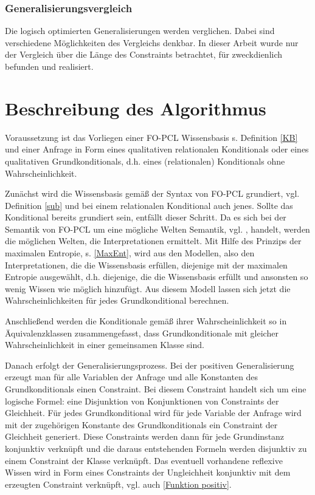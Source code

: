 \documentclass[a4paper, 11pt]{book}
\begin{document}
{\subsubsection{Generalisierungsvergleich}
Die logisch optimierten Generalisierungen werden verglichen. Dabei sind verschiedene Möglichkeiten des Vergleichs denkbar. In dieser Arbeit wurde nur der Vergleich über die Länge des Constraints betrachtet, für zweckdienlich befunden und realisiert.

\section{Beschreibung des Algorithmus}
Voraussetzung ist das Vorliegen einer FO-PCL Wissensbasis  s. Definition \ref{KB} und einer Anfrage in Form eines qualitativen relationalen Konditionals oder eines qualitativen Grundkonditionals, d.h. eines (relationalen) Konditionals ohne Wahrscheinlichkeit.

Zunächst wird die Wissensbasis gemäß der Syntax von FO-PCL grundiert, vgl. Definition \ref{sub}  und bei einem relationalen Konditional auch jenes. Sollte das Konditional bereits grundiert sein, entfällt dieser Schritt. Da es sich bei der Semantik von FO-PCL um eine mögliche Welten Semantik, vgl. \cite{GT07}, handelt, werden die möglichen Welten, die Interpretationen ermittelt. Mit Hilfe des Prinzips der maximalen Entropie, s. \ref{MaxEnt},  wird aus den Modellen, also den Interpretationen, die die Wissensbasis erfüllen, diejenige mit der maximalen Entropie ausgewählt, d.h. diejenige, die die Wissensbasis erfüllt und ansonsten so wenig Wissen wie möglich hinzufügt.
Aus diesem Modell lassen sich jetzt die Wahrscheinlichkeiten für jedes Grundkonditional berechnen.


Anschließend werden die Konditionale gemäß ihrer Wahrscheinlichkeit so in Äquivalenzklassen zusammengefasst, dass Grundkonditionale mit gleicher Wahrscheinlichkeit in einer gemeinsamen Klasse sind. 

Danach erfolgt der Generalisierungsprozess.
Bei der positiven Generalisierung  erzeugt man für alle Variablen der Anfrage und alle Konstanten des Grundkonditionals einen Constraint. Bei diesem Constraint handelt sich um eine logische Formel: eine Disjunktion von Konjunktionen von Constraints der Gleichheit. Für jedes Grundkonditional wird für jede Variable der Anfrage wird mit der zugehörigen Konstante des Grundkonditionals ein Constraint der Gleichheit generiert. Diese Constraints werden dann für jede Grundinstanz konjunktiv verknüpft und die daraus entstehenden Formeln werden disjunktiv zu einem Constraint der Klasse verknüpft. Das eventuell vorhandene reflexive Wissen wird in Form eines Constraints der Ungleichheit konjunktiv mit dem erzeugten Constraint verknüpft, vgl. auch \ref{Funktion positiv}.

}
\end{document}
